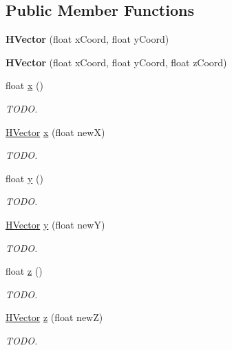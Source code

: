 \subsection*{Public Member Functions}
\begin{DoxyCompactItemize}
\item 
\hypertarget{classhype_1_1core_1_1util_1_1_h_vector_a8dd9abf7253ff9de03d6c9b0584a1781}{{\bfseries H\-Vector} (float x\-Coord, float y\-Coord)}\label{classhype_1_1core_1_1util_1_1_h_vector_a8dd9abf7253ff9de03d6c9b0584a1781}

\item 
\hypertarget{classhype_1_1core_1_1util_1_1_h_vector_a55e5caf3408b2fbdae8abea34586d602}{{\bfseries H\-Vector} (float x\-Coord, float y\-Coord, float z\-Coord)}\label{classhype_1_1core_1_1util_1_1_h_vector_a55e5caf3408b2fbdae8abea34586d602}

\item 
float \hyperlink{classhype_1_1core_1_1util_1_1_h_vector_a750d6b2c0cd432443fd024a2f324df88}{x} ()
\begin{DoxyCompactList}\small\item\em T\-O\-D\-O. \end{DoxyCompactList}\item 
\hyperlink{classhype_1_1core_1_1util_1_1_h_vector}{H\-Vector} \hyperlink{classhype_1_1core_1_1util_1_1_h_vector_acd3b46b1b41b31e613efd3434355d724}{x} (float new\-X)
\begin{DoxyCompactList}\small\item\em T\-O\-D\-O. \end{DoxyCompactList}\item 
float \hyperlink{classhype_1_1core_1_1util_1_1_h_vector_aaaec18773bf1359f02ecedc356fe04b0}{y} ()
\begin{DoxyCompactList}\small\item\em T\-O\-D\-O. \end{DoxyCompactList}\item 
\hyperlink{classhype_1_1core_1_1util_1_1_h_vector}{H\-Vector} \hyperlink{classhype_1_1core_1_1util_1_1_h_vector_ab8fda7055b1c13c32c99a44ab9371920}{y} (float new\-Y)
\begin{DoxyCompactList}\small\item\em T\-O\-D\-O. \end{DoxyCompactList}\item 
float \hyperlink{classhype_1_1core_1_1util_1_1_h_vector_ae47c1f00e85ed14bda11e6e064ddcb61}{z} ()
\begin{DoxyCompactList}\small\item\em T\-O\-D\-O. \end{DoxyCompactList}\item 
\hyperlink{classhype_1_1core_1_1util_1_1_h_vector}{H\-Vector} \hyperlink{classhype_1_1core_1_1util_1_1_h_vector_a556652c94fd7570e60c69a733bb518d9}{z} (float new\-Z)
\begin{DoxyCompactList}\small\item\em T\-O\-D\-O. \end{DoxyCompactList}\end{DoxyCompactItemize}
